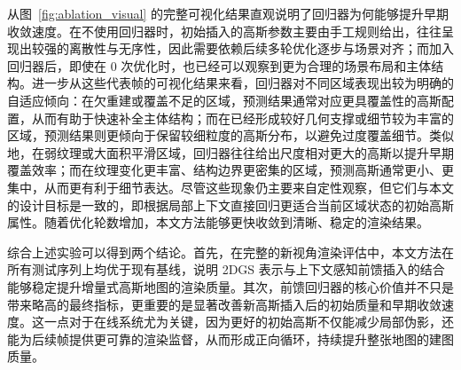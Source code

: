 \begingroup
\renewcommand{\tablename}{Table}
\begin{table}[!t]
\centering
\caption{Early convergence of the feed-forward regressor ablation on \texttt{hku\_campus\_00}. Values are averaged over valid training frames; bold indicates the better result at each step.}
\label{tab:ablation_curves}
\renewcommand{\arraystretch}{1.14}
\setlength{\tabcolsep}{4pt}
\end{table}
\endgroup

从图~\ref{fig:ablation_visual} 的完整可视化结果直观说明了回归器为何能够提升早期收敛速度。在不使用回归器时，初始插入的高斯参数主要由手工规则给出，往往呈现出较强的离散性与无序性，因此需要依赖后续多轮优化逐步与场景对齐；而加入回归器后，即使在 0 次优化时，也已经可以观察到更为合理的场景布局和主体结构。进一步从这些代表帧的可视化结果来看，回归器对不同区域表现出较为明确的自适应倾向：在欠重建或覆盖不足的区域，预测结果通常对应更具覆盖性的高斯配置，从而有助于快速补全主体结构；而在已经形成较好几何支撑或细节较为丰富的区域，预测结果则更倾向于保留较细粒度的高斯分布，以避免过度覆盖细节。类似地，在弱纹理或大面积平滑区域，回归器往往给出尺度相对更大的高斯以提升早期覆盖效率；而在纹理变化更丰富、结构边界更密集的区域，预测高斯通常更小、更集中，从而更有利于细节表达。尽管这些现象仍主要来自定性观察，但它们与本文的设计目标是一致的，即根据局部上下文直接回归更适合当前区域状态的初始高斯属性。随着优化轮数增加，本文方法能够更快收敛到清晰、稳定的渲染结果。

综合上述实验可以得到两个结论。首先，在完整的新视角渲染评估中，本文方法在所有测试序列上均优于现有基线，说明 2DGS 表示与上下文感知前馈插入的结合能够稳定提升增量式高斯地图的渲染质量。其次，前馈回归器的核心价值并不只是带来略高的最终指标，更重要的是显著改善新高斯插入后的初始质量和早期收敛速度。这一点对于在线系统尤为关键，因为更好的初始高斯不仅能减少局部伪影，还能为后续帧提供更可靠的渲染监督，从而形成正向循环，持续提升整张地图的建图质量。
